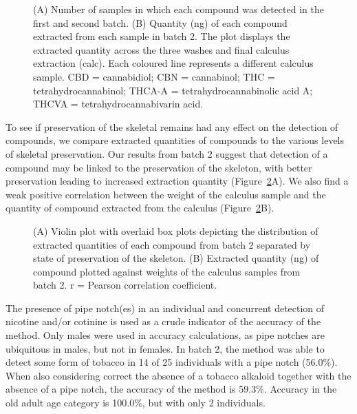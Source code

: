 \documentclass[
  b5paper,
]{book}
\begin{document}
\begin{figure}


\caption{\label{fig-auth-plot-batch2}(A) Number of samples in which each
compound was detected in the first and second batch. (B) Quantity (ng)
of each compound extracted from each sample in batch 2. The plot
displays the extracted quantity across the three washes and final
calculus extraction (calc). Each coloured line represents a different
calculus sample. CBD = cannabidiol; CBN = cannabinol; THC =
tetrahydrocannabinol; THCA-A = tetrahydrocannabinolic acid A; THCVA =
tetrahydrocannabivarin acid.}

\end{figure}%

To see if preservation of the skeletal remains had any effect on the
detection of compounds, we compare extracted quantities of compounds to
the various levels of skeletal preservation. Our results from batch 2
suggest that detection of a compound may be linked to the preservation
of the skeleton, with better preservation leading to increased
extraction quantity (Figure~\ref{fig-detection-preservation}A). We also
find a weak positive correlation between the weight of the calculus
sample and the quantity of compound extracted from the calculus
(Figure~\ref{fig-detection-preservation}B).

\begin{figure}


\caption{\label{fig-detection-preservation}(A) Violin plot with overlaid
box plots depicting the distribution of extracted quantities of each
compound from batch 2 separated by state of preservation of the
skeleton. (B) Extracted quantity (ng) of compound plotted against
weights of the calculus samples from batch 2. r = Pearson correlation
coefficient.}

\end{figure}%

The presence of pipe notch(es) in an individual and concurrent detection
of nicotine and/or cotinine is used as a crude indicator of the accuracy
of the method. Only males were used in accuracy calculations, as pipe
notches are ubiquitous in males, but not in females. In batch 2, the
method was able to detect some form of tobacco in 14 of 25 individuals
with a pipe notch (56.0\%). When also considering correct the absence of
a tobacco alkaloid together with the absence of a pipe notch, the
accuracy of the method is 59.3\%. Accuracy in the old adult age category
is 100.0\%, but with only 2 individuals.
\end{document}
